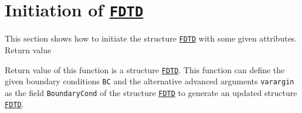 \section{Initiation of \hyperref[para:FDTD]{\texttt{FDTD}}} \label{sec:FDTD_ATTRIBUTE}
 \label{para:FDTD_ATTRIBUTE}
This section shows how to initiate the structure \hyperref[para:FDTD]{\texttt{FDTD}} with some given attributes. 
	      Return value 
	\begin{myindentpar}
      Return value of this function is a structure \hyperref[para:FDTD]{\texttt{FDTD}}. This function can define the given boundary conditions \texttt{BC} and the alternative advanced arguments \texttt{varargin} as the field \texttt{BoundaryCond} of the structure  \hyperref[para:FDTD]{\texttt{FDTD}} to generate an updated structure \hyperref[para:FDTD]{\texttt{FDTD}}.  
      \end{myindentpar}
	      \\ \\
